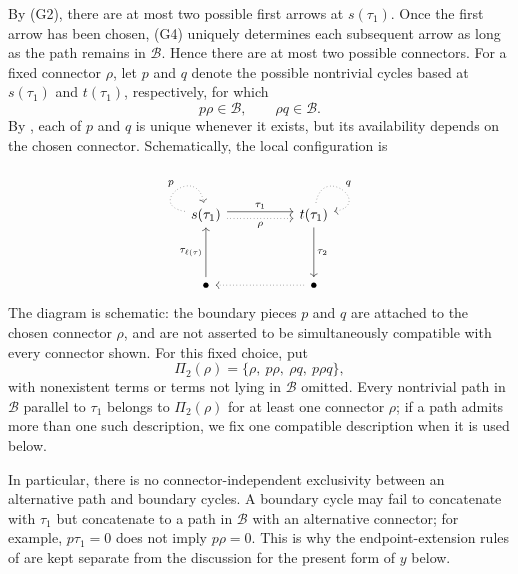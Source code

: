 \documentclass[11pt,a4paper,reqno]{amsart}
\newcommand{\mB}{\mathcal B}
\newcommand{\taue}{\tau_{\ell(\tau)}}
\theoremstyle{plain}
\theoremstyle{definition}
\numberwithin{equation}{section}
\begin{document}
	By \textup{(G2)}, there are at most two possible first arrows at
	$s(\tau_1)$. Once the first arrow has been chosen, \textup{(G4)} uniquely
	determines each subsequent arrow as long as the path remains in $\mB$.
	Hence there are at most two possible connectors.  For a fixed connector $\rho$, let $p$ and $q$ denote the
	possible nontrivial cycles based at $s(\tau_1)$ and $t(\tau_1)$,
	respectively, for which
	\[
	p\rho\in\mB,
	\qquad
	\rho q\in\mB.
	\]
	By , each of $p$ and $q$ is unique whenever it exists,
	but its availability depends on the chosen connector.  Schematically, the
	local configuration is
	\[
	\begin{tikzcd}
		{s(\tau_1)} && {t(\tau_1)} \\
		\\
		\bullet && \bullet
		\arrow["p", dotted, from=1-1, to=1-1, loop, in=100, out=170, distance=10mm]
		\arrow["{\tau_1}", shift left, from=1-1, to=1-3]
		\arrow["\rho"', shift right, dotted, from=1-1, to=1-3]
		\arrow["q", dotted, from=1-3, to=1-3, loop, in=10, out=80, distance=10mm]
		\arrow["{\tau_2}", from=1-3, to=3-3]
		\arrow["\taue", from=3-1, to=1-1]
		\arrow[dotted, from=3-3, to=3-1]
	\end{tikzcd}
	\]
	The diagram is schematic: the boundary pieces $p$ and $q$ are attached to the
	chosen connector $\rho$, and are not asserted to be simultaneously compatible
	with every connector shown.  For this fixed choice, put
	\[
	\Pi_2(\rho)=\{\rho,\ p\rho,\ \rho q,\ p\rho q\},
	\]
	with nonexistent terms or terms not lying in $\mB$ omitted.  Every nontrivial path in $\mB$
	parallel to $\tau_1$ belongs to $\Pi_2(\rho)$ for at least one connector
	$\rho$; if a path admits more than one such description, we fix one compatible
	description when it is used below.
	
	In particular, there is no connector-independent exclusivity between an
	alternative path and boundary cycles.  A boundary cycle may fail to concatenate
	with $\tau_1$ but concatenate to a path in $\mB$ with an alternative connector; for
	example, $p\tau_1=0$ does not imply $p\rho=0$.  This is why the endpoint-extension
	rules of  are kept separate from the
	discussion for the present form of $y$ below.
	
\end{document}
